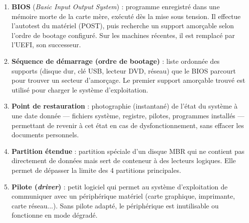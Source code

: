 \documentclass[11pt]{article}
\newcommand{\cle}[1]{{\popxbold\color{popdark}#1}}
\begin{document}
\begin{corrige}
\begin{enumerate}
\item \textbf{BIOS} (\emph{Basic Input Output System}) : programme enregistré dans une mémoire morte de la carte mère, exécuté dès la mise sous tension. Il effectue l'autotest du matériel (POST), puis recherche un support amorçable selon l'ordre de bootage configuré. Sur les machines récentes, il est remplacé par l'\cle{UEFI}, son successeur.
\item \textbf{Séquence de démarrage (ordre de bootage)} : liste ordonnée des supports (disque dur, clé USB, lecteur DVD, réseau) que le BIOS parcourt pour trouver un secteur d'amorçage. Le premier support amorçable trouvé est utilisé pour charger le système d'exploitation.
\item \textbf{Point de restauration} : photographie (instantané) de l'état du système à une date donnée — fichiers système, registre, pilotes, programmes installés — permettant de revenir à cet état en cas de dysfonctionnement, sans effacer les documents personnels.
\item \textbf{Partition étendue} : partition spéciale d'un disque MBR qui ne contient pas directement de données mais sert de conteneur à des \cle{lecteurs logiques}. Elle permet de dépasser la limite des 4 partitions principales.
\item \textbf{Pilote (\emph{driver})} : petit logiciel qui permet au système d'exploitation de communiquer avec un périphérique matériel (carte graphique, imprimante, carte réseau...). Sans pilote adapté, le périphérique est inutilisable ou fonctionne en mode dégradé.
\end{enumerate}
\end{corrige}
\end{document}
